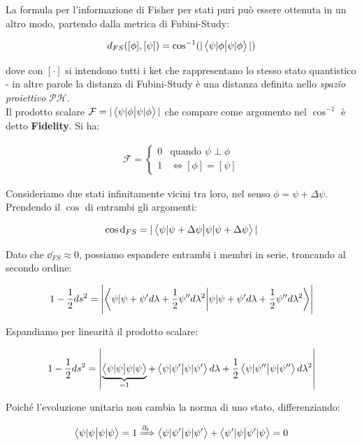 \documentclass[main.tex]{subfiles}
\begin{document}
La formula per l'informazione di Fisher per stati puri può essere ottenuta in un altro modo, partendo dalla metrica di Fubini-Study:

\begin{align*}
d_{FS} ([\phi], [\psi]) = \cos^{-1}(|\braket{\psi|\phi}|)
\end{align*}

dove con $[\cdot]$ si intendono tutti i ket che rappresentano lo stesso stato quantistico - in altre parole la distanza di Fubini-Study è una distanza definita nello \textit{spazio proiettivo} $\mathcal{P}\mathcal{H}$.\\
Il prodotto scalare $\mathcal{F}=|\braket{\psi|\phi}|$ che compare come argomento nel $\cos^{-1}$ è detto \textbf{Fidelity}. Si ha:

\begin{align*}
\mathcal{F} = \begin{cases}
0 & \text{quando } \psi \perp \phi\\
1 & \Leftrightarrow [\phi]=[\psi]
\end{cases}
\end{align*}

Consideriamo due stati infinitamente vicini tra loro, nel senso $\phi = \psi + \Delta\psi$. Prendendo il $\cos$ di entrambi gli argomenti:

\begin{align*}
\cos \dd_{FS} = |\braket{\psi|\psi+\Delta\psi}|
\end{align*}

Dato che $\dd_{FS}\approx 0$, possiamo espandere entrambi i membri in serie, troncando al secondo ordine:

\begin{align*}
1-\frac{1}{2} ds^2 = \left|\braket{\psi|\psi + \psi'd\lambda + \frac{1}{2}\psi'' d\lambda^2}\right|
\end{align*}

Espandiamo per linearità il prodotto scalare:

\begin{align}
1-\frac{1}{2}ds^2 = \left| \underbrace{\braket{\psi|\psi} }_{=1}+ \braket{\psi|\psi'}d\lambda + \frac{1}{2} \braket{\psi|\psi''}d\lambda^2 \right|
\label{eqn:espansione-metrica}
 \end{align}

Poiché l'evoluzione unitaria non cambia la norma di uno stato, differenziando:

\begin{align*}
\braket{\psi|\psi} = 1 \xRightarrow{\partial_t} \braket{\psi|\psi'} + \braket{\psi'|\psi} =0
\end{align*}
\end{document}
